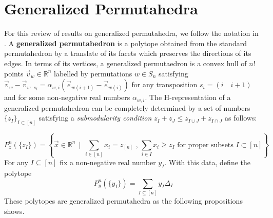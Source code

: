 \documentclass[english,11pt]{article}
\theoremstyle{definition}
\theoremstyle{definition}
\theoremstyle{definition}
\theoremstyle{remark}
\theoremstyle{definition}
\begin{document}
\section{Generalized Permutahedra}

For this review of results on generalized permutahedra, we follow the notation in \cite{Postnikov-PAB}. A \textbf{generalized permutahedron} is a polytope obtained from the standard permutahedron by a translate of its facets which preserves the directions of its edges. In terms of its vertices, a generalized permutaedron is a convex hull of $n!$ points $\Vec{v}_w \in  \mathbb{R}^n$ labelled by permutations $w\in S_n$ satisfying $\Vec{v}_{w}-\Vec{v}_{w\cdot s_i} = \alpha_{w,i}\left( \Vec{e}_{w(i+1)}- \Vec{e}_{w(i)} \right)$ for any transposition $s_i = (i \quad i+1)$ and for some non-negative real numbers $\alpha_{w,i}$. The H-representation of a generalized permutahedron can be completely determined by a set of numbers $\{z_I\}_{I\subset [n]}$ satisfying a \textit{submodularity condition} $z_I + z_J \leq z_{I\cup J} + z_{I \cap J}$ \cite{Aguiar2017HopfPermutahedra} as follows:

$$P_z^n(\{z_I\}) = \left\{ \Vec{x}\in\mathbb{R}^n \, \mid \, \sum_{i\in[n]}x_i = z_{[n]} \text{ , } \sum_{i\in I}x_i \geq z_I \text{ for proper subsets }I\subset [n]\right\}$$
For any $I\subseteq [n]$ fix a non-negative real number $y_I$. With this data, define the polytope $$P_y^n(\{y_I\}) = \sum_{I\subseteq [n]}y_I\Delta_I$$ These polytopes are generalized permutahedra as the following propositions shows. 
\end{document}
